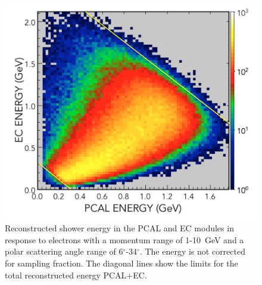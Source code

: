 \begin{figure}[t]
\centering
\includegraphics[width=0.8\columnwidth,keepaspectratio]{img/S10_1_000.png}
\caption[]{Reconstructed shower energy in the PCAL and EC modules in response to electrons with a momentum
  range of 1-10~GeV and a polar scattering angle range of 6$^\circ$-34$^\circ$. The energy is not corrected for
  sampling fraction. The diagonal lines show the limits for the total reconstructed energy PCAL+EC.}
\label{fig:S10_1_000}
\end{figure}

